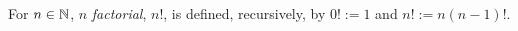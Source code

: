 \guard

\begin{defn}
\label{defn:factorial}
  For $n\in\mathbb{N}$, $n$ \emph{factorial}, $n!$, is defined, recursively, by $0!:=1$ and $n!:=n(n-1)!$.
\end{defn}
